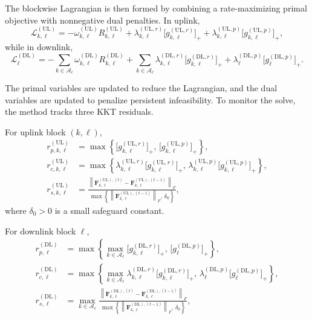 \documentclass[11pt]{article}
\newcommand{\Aset}{\mathcal{A}}
\newcommand{\F}{\mathbf{F}}
\newcommand{\norm}[1]{\left\lVert #1 \right\rVert}
\newcommand{\UL}{\mathrm{UL}}
\newcommand{\DL}{\mathrm{DL}}
\begin{document}
The blockwise Lagrangian is then formed by combining a rate-maximizing primal
objective with nonnegative dual penalties. In uplink,
\begin{equation}
\mathcal{L}_{k,\ell}^{(\UL)}
=
-\omega_{k,\ell}^{(\UL)}R_{k,\ell}^{(\UL)}
+
\lambda_{k,\ell}^{(\UL,r)}\bigl[g_{k,\ell}^{(\UL,r)}\bigr]_+
+
\lambda_{k,\ell}^{(\UL,p)}\bigl[g_{k,\ell}^{(\UL,p)}\bigr]_+,
\label{eq:ul-lagrangian}
\end{equation}
while in downlink,
\begin{equation}
\mathcal{L}_{\ell}^{(\DL)}
=
-\sum_{k\in\Aset_\ell}
\omega_{k,\ell}^{(\DL)} R_{k,\ell}^{(\DL)}
+
\sum_{k\in\Aset_\ell}
\lambda_{k,\ell}^{(\DL,r)}\bigl[g_{k,\ell}^{(\DL,r)}\bigr]_+
+
\lambda_{\ell}^{(\DL,p)}\bigl[g_{\ell}^{(\DL,p)}\bigr]_+.
\label{eq:dl-lagrangian}
\end{equation}

The primal variables are updated to reduce the Lagrangian, and the dual
variables are updated to penalize persistent infeasibility. To monitor the
solve, the method tracks three KKT residuals.

For uplink block $(k,\ell)$,
\begin{align}
r_{p,k,\ell}^{(\UL)}
&=
\max\!\left\{
\bigl[g_{k,\ell}^{(\UL,r)}\bigr]_+,\,
\bigl[g_{k,\ell}^{(\UL,p)}\bigr]_+
\right\},
\label{eq:ul-rp}
\\
r_{c,k,\ell}^{(\UL)}
&=
\max\!\left\{
\lambda_{k,\ell}^{(\UL,r)}\bigl[g_{k,\ell}^{(\UL,r)}\bigr]_+,\,
\lambda_{k,\ell}^{(\UL,p)}\bigl[g_{k,\ell}^{(\UL,p)}\bigr]_+
\right\},
\label{eq:ul-rc}
\\
r_{s,k,\ell}^{(\UL)}
&=
\frac{
\norm{
\F_{k,\ell}^{(\UL),(t)}-\F_{k,\ell}^{(\UL),(t-1)}
}_F
}{
\max\!\left\{
\norm{\F_{k,\ell}^{(\UL),(t-1)}}_F,\,
\delta_0
\right\}
},
\label{eq:ul-rs}
\end{align}
where $\delta_0>0$ is a small safeguard constant.

For downlink block $\ell$,
\begin{align}
r_{p,\ell}^{(\DL)}
&=
\max\!\left\{
\max_{k\in\Aset_\ell}\bigl[g_{k,\ell}^{(\DL,r)}\bigr]_+,\,
\bigl[g_{\ell}^{(\DL,p)}\bigr]_+
\right\},
\label{eq:dl-rp}
\\
r_{c,\ell}^{(\DL)}
&=
\max\!\left\{
\max_{k\in\Aset_\ell}
\lambda_{k,\ell}^{(\DL,r)}\bigl[g_{k,\ell}^{(\DL,r)}\bigr]_+,\,
\lambda_{\ell}^{(\DL,p)}\bigl[g_{\ell}^{(\DL,p)}\bigr]_+
\right\},
\label{eq:dl-rc}
\\
r_{s,\ell}^{(\DL)}
&=
\max_{k\in\Aset_\ell}
\frac{
\norm{
\F_{k,\ell}^{(\DL),(t)}-\F_{k,\ell}^{(\DL),(t-1)}
}_F
}{
\max\!\left\{
\norm{\F_{k,\ell}^{(\DL),(t-1)}}_F,\,
\delta_0
\right\}
},
\label{eq:dl-rs}
\end{align}
\end{document}
